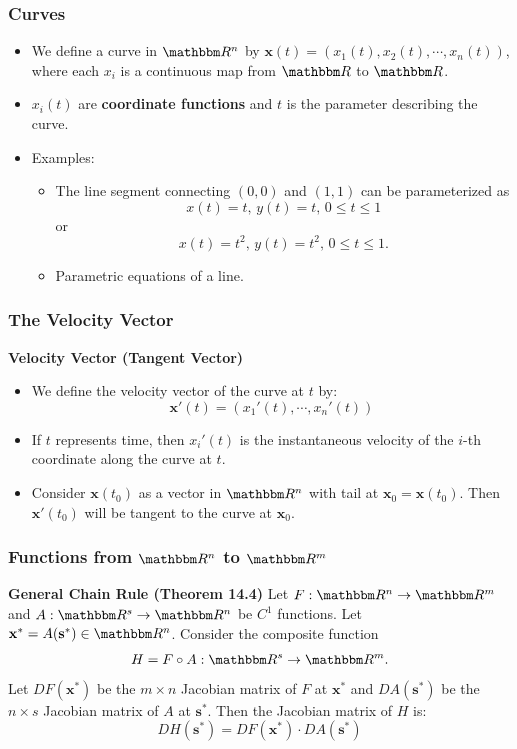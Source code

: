 \documentclass[9pt,aspectratio=169]{beamer}
\newcommand{\RR}{\mathbbm R}
\begin{document}
\begin{frame}
	\frametitle{Curves}
	\begin{itemize}
		\item We define a curve in $\RR^n$ by $\mathbf{x}(t) =
        \left(x_1(t),x_2(t),\cdots, x_n(t)\right)$, where each $x_i$ is a
        continuous map from $\RR$ to $\RR$.
		\item $x_i(t)$ are \textbf{coordinate functions} and $t$ is the
        parameter describing the curve.
        \item Examples:
        \begin{itemize}
            \item The line segment connecting $(0,0)$ and $(1,1)$ can be
            parameterized as
            $$x(t) = t,\,y(t)=t,\, 0\leq t\leq 1$$
            or
            $$x(t) = t^2,\, y(t)=t^2,\, 0\leq t\leq 1.$$
            \item Parametric equations of a line.
        \end{itemize}

	\end{itemize}
\end{frame}		

\begin{frame}
	\frametitle{The Velocity Vector}
	\begin{block}{\textbf{Velocity Vector (Tangent Vector)}}
		\begin{itemize}
			\item We define the velocity vector of the curve at $t$
            by: $$\mathbf{x}'(t) = \left(x_1'(t),\cdots,x_n'(t)\right)$$
			\item If $t$ represents time, then $x_i'(t)$ is the instantaneous
            velocity of the $i$-th coordinate along the curve at $t$.
			\item Consider $\mathbf{x}(t_0)$ as a vector in $\RR^n$ with tail
            at $\mathbf{x}_0=\mathbf{x}(t_0)$. Then $\mathbf{x}'(t_0)$ will
            be tangent to the curve at $\mathbf{x}_0$.
		\end{itemize}
	\end{block}
\end{frame}


\begin{frame}
	\frametitle{Functions from $\RR^n$ to $\RR^m$}
	\begin{block}{\textbf{General Chain Rule (Theorem 14.4)}}
		Let $F:\RR^n \to \RR^m$ and $A: \RR^s \to \RR^n$ be $C^1$ functions.
        Let $\mathbf{x^*} = A(\mathbf{s^*})\in \RR^n$. Consider the composite
        function
        $$H = F\circ A: \RR^s\to \RR^m.$$ Let $DF(\mathbf{x^*})$
        be the $m\times n$ Jacobian matrix of $F$ at $\mathbf{x^*}$ and
        $DA(\mathbf{s^*})$ be the $n\times s$ Jacobian matrix of $A$ at
        $\mathbf{s^*}$. Then the Jacobian matrix of $H$ is:
		$$DH(\mathbf{s^*}) = DF(\mathbf{x^*})\cdot DA(\mathbf{s^*})$$
	\end{block}
\end{frame}
\end{document}
